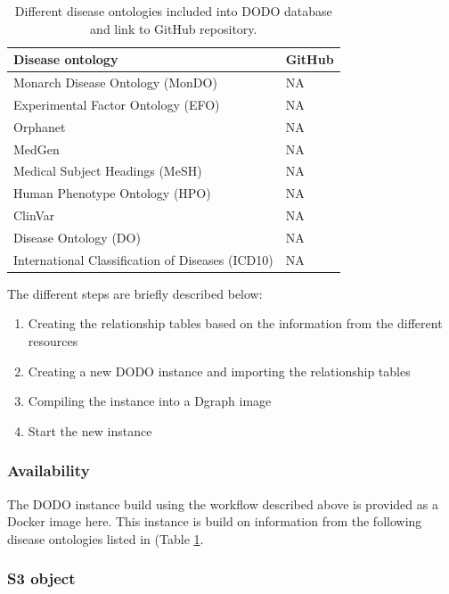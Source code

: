 \documentclass[9pt,a4paper,]{extarticle}
\begin{document}
\begin{table}

\caption{\label{tab:githubOntology}Different disease ontologies included into DODO database and link to GitHub repository.}
\centering
\begin{tabular}[t]{ll}
\toprule
Disease ontology & GitHub\\
\midrule
Monarch Disease Ontology (MonDO) & NA\\
Experimental Factor Ontology (EFO) & NA\\
Orphanet & NA\\
MedGen & NA\\
Medical Subject Headings (MeSH) & NA\\
\addlinespace
Human Phenotype Ontology (HPO) & NA\\
ClinVar & NA\\
Disease Ontology (DO) & NA\\
International Classification of Diseases (ICD10) & NA\\
\bottomrule
\end{tabular}
\end{table}

The different steps are briefly described below:

\begin{enumerate}
\def\labelenumi{\arabic{enumi}.}
\item
  Creating the relationship tables based on the information from the different resources
\item
  Creating a new DODO instance and importing the relationship tables
\item
  Compiling the instance into a Dgraph image
\item
  Start the new instance
\end{enumerate}

\hypertarget{availability}{%
\subsubsection{Availability}\label{availability}}

The DODO instance build using the workflow described above is provided as a Docker image \citep{Docker2017} here.
This instance is build on information from the following disease ontologies listed in (Table \ref{tab:githubOntology}.

\hypertarget{s3-object}{%
\subsubsection{S3 object}\label{s3-object}}
\end{document}
